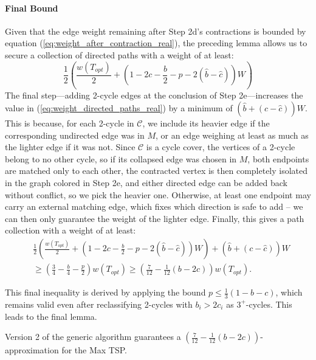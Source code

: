 \paragraph{Final Bound}
Given that the edge weight remaining after Step 2d's contractions is bounded by
equation (\ref{eq:weight_after_contraction_real}), the preceding lemma allows us
to secure a collection of directed paths with a weight of at least:
\begin{equation} \label{eq:weight_directed_paths_real}
\frac{1}{2} \left( \frac{w(T_{opt})}{2} + \left(1 - 2c - \frac{b}{2} - p - 2(\hat{b} - \hat{c})\right)W \right)
\end{equation}
The final step—adding 2-cycle edges at the conclusion of Step 2e—increases the
value in (\ref{eq:weight_directed_paths_real}) by a minimum of $(\hat{b} + (c -
\hat{c}))W$. This is because, for each 2-cycle in $\mathcal{C}$, we include its
heavier edge if the corresponding undirected edge was in $M$, or an edge
weighing at least as much as the lighter edge if it was not. Since $\mathcal{C}$
is a cycle cover, the vertices of a 2-cycle belong to no other cycle, so if its
collapsed edge was chosen in $M$, both endpoints are matched only to each other,
the contracted vertex is then completely isolated in the graph colored in Step
2e, and either directed edge can be added back without conflict, so we pick the
heavier one. Otherwise, at least one endpoint may carry an external matching
edge, which fixes which direction is safe to add -- we can then only guarantee
the weight of the lighter edge. Finally, this gives a path collection with a
weight of at least:
\begin{align*}
& \frac{1}{2} \left( \frac{w(T_{opt})}{2} + \left(1 - 2c - \frac{b}{2} - p - 2(\hat{b} - \hat{c})\right)W \right) + (\hat{b} + (c - \hat{c}))W \\
& \ge \left( \frac{3}{4} - \frac{b}{4} - \frac{p}{2} \right) w(T_{opt})
\ge \left( \frac{7}{12} - \frac{1}{12}(b - 2c) \right) w(T_{opt}).
\end{align*}

This final inequality is derived by applying the bound $p \le \frac{1}{3}(1 - b
- c)$, which remains valid even after reclassifying 2-cycles with $b_i > 2c_i$
as $3^+$-cycles. This leads to the final lemma.

\begin{theorem} \label{lemma:version2_final}
Version 2 of the generic algorithm guarantees a $\left(\frac{7}{12} -
\frac{1}{12}(b - 2c)\right)$-approximation for the Max TSP.
\end{theorem}

